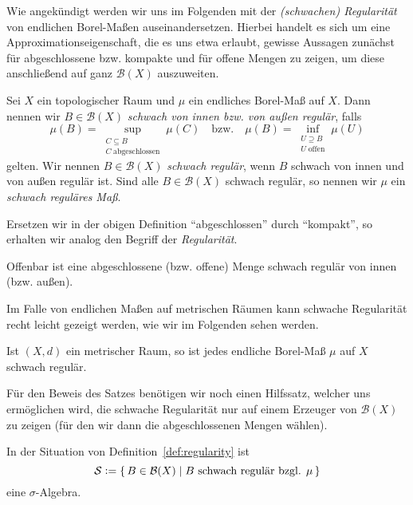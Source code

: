 \documentclass[../main/main.tex]{subfiles}
\begin{document}
	Wie angekündigt werden wir uns im Folgenden mit der \emph{(schwachen) Regularität} von endlichen Borel-Maßen auseinandersetzen. 
	Hierbei handelt es sich um eine Approximationseigenschaft, die es uns etwa erlaubt, gewisse Aussagen 
	zunächst für abgeschlossene bzw. kompakte und für offene Mengen zu zeigen, um diese 
	anschließend auf ganz $\mathcal{B}(X)$ auszuweiten. 
	
	\begin{Definition}
		\label{def:regularity}
		Sei $X$ ein topologischer Raum und $\mu$ ein endliches Borel-Maß auf $X$. 
		Dann nennen wir $B \in \mathcal{B}(X)$ \emph{schwach von 
			innen bzw. von außen regulär}, falls
		$$\mu(B) = \sup_{\substack{C \subseteq B \\ C \; \text{abgeschlossen}}} \mu(C) 
		\quad \text{bzw.} \quad \mu(B) = \inf_{\substack{U \supseteq B \\ U \; \text{offen}}} 
		\mu(U)$$
		gelten. Wir nennen $B \in \mathcal{B}(X)$ \emph{schwach regulär}, wenn $B$ schwach von innen und 
		von außen regulär ist. Sind alle $B \in \mathcal{B}(X)$ schwach regulär, 
		so nennen wir $\mu$ ein \emph{schwach reguläres Maß}.
	\end{Definition}
	
	\begin{Bemerkung}
		Ersetzen wir in der obigen Definition \enquote{abgeschlossen} durch \enquote{kompakt}, 
		so erhalten wir analog den Begriff der \emph{Regularität}. 
		
		Offenbar ist eine abgeschlossene (bzw. offene) Menge schwach regulär von innen (bzw. außen).
	\end{Bemerkung}
	
	Im Falle von endlichen Maßen auf metrischen Räumen kann schwache Regularität 
	recht leicht gezeigt werden, wie wir im Folgenden sehen werden.
	
	\begin{Satz}
		\label{thm:weakregularity}
		Ist $(X, d)$ ein metrischer Raum, so ist jedes endliche Borel-Maß $\mu$ auf $X$ schwach regulär.
	\end{Satz}
	
	Für den Beweis des Satzes benötigen wir noch einen Hilfssatz, welcher 
	uns ermöglichen wird, die schwache Regularität nur auf einem Erzeuger von $\mathcal{B}(X)$ 
	zu zeigen (für den wir dann die abgeschlossenen Mengen wählen).
	
	\begin{Hilfssatz}
		\label{lem:sigmaalg}
		In der Situation von Definition~\ref{def:regularity} ist
		$$\mathcal{S} \vcentcolon = \left\{\, B \in \mathcal{B}(X) \; \middle| \; B \text{ schwach regulär bzgl. } \mu \,\right\}$$
		eine $\sigma$-Algebra.
	\end{Hilfssatz}
	
\end{document}
